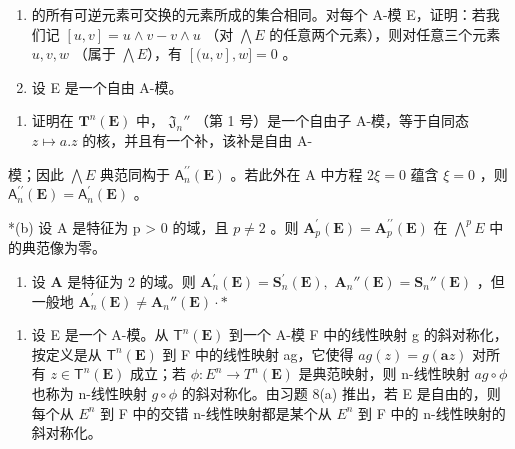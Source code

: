 \begin{enumerate}
\def\labelenumi{\arabic{enumi}.}
\setcounter{enumi}{6}
\item
  的所有可逆元素可交换的元素所成的集合相同。对每个 A-模 E，证明：若我们记 \([u, v] = u \wedge v - v \wedge u\) （对 \(\bigwedge E\) 的任意两个元素），则对任意三个元素 \(u, v, w\) （属于 \(\bigwedge E\)），有 \([(u, v], w] = 0\) 。
\item
  设 E 是一个自由 A-模。
\end{enumerate}

\begin{enumerate}
\def\labelenumi{(\alph{enumi})}
\tightlist
\item
  证明在 \(\mathbf{T}^n (\mathbf{E})\) 中， \(\mathfrak{J}_n''\) （第 1 号）是一个自由子 A-模，等于自同态 \(z\mapsto a.z\) 的核，并且有一个补，该补是自由 A-
\end{enumerate}

模；因此 \(\bigwedge E\) 典范同构于 \(\mathsf{A}_n^{\prime \prime}(\mathbf{E})\) 。若此外在 A 中方程 \(2\xi = 0\) 蕴含 \(\xi = 0\) ，则 \(\mathsf{A}_n^{\prime \prime}(\mathbf{E}) = \mathsf{A}_n^{\prime}(\mathbf{E})\) 。

*(b) 设 A 是特征为 p \textgreater{} 0 的域，且 \(p \neq 2\) 。则 \(\mathbf{A}_{p}^{\prime}(\mathbf{E}) = \mathbf{A}_{p}^{\prime\prime}(\mathbf{E})\) 在 \(\bigwedge^{p} E\) 中的典范像为零。

\begin{enumerate}
\def\labelenumi{(\alph{enumi})}
\setcounter{enumi}{2}
\tightlist
\item
  设 \(\mathbf{A}\) 是特征为 2 的域。则 \(\mathbf{A}_n^\prime (\mathbf{E}) = \mathbf{S}_n^\prime (\mathbf{E}),\) \(\mathbf{A}_n''(\mathbf{E}) = \mathbf{S}_n''(\mathbf{E})\) ，但一般地 \(\mathbf{A}_n^\prime (\mathbf{E})\neq \mathbf{A}_n''(\mathbf{E})\cdot *\)
\end{enumerate}

\begin{enumerate}
\def\labelenumi{\arabic{enumi}.}
\setcounter{enumi}{8}
\tightlist
\item
  设 E 是一个 A-模。从 \(\mathsf{T}^{n}(\mathbf{E})\) 到一个 A-模 F 中的线性映射 g 的斜对称化，按定义是从 \(\mathsf{T}^{n}(\mathbf{E})\) 到 F 中的线性映射 ag，它使得 \(ag(z) = g(\boldsymbol{a}z)\) 对所有 \(z \in \mathsf{T}^{n}(\mathbf{E})\) 成立；若 \(\phi: E^{n} \to T^{n}(\mathbf{E})\) 是典范映射，则 n-线性映射 \(ag \circ \phi\) 也称为 n-线性映射 \(g \circ \phi\) 的斜对称化。由习题 8(a) 推出，若 E 是自由的，则每个从 \(E^{n}\) 到 F 中的交错 n-线性映射都是某个从 \(E^{n}\) 到 F 中的 n-线性映射的斜对称化。
\end{enumerate}


